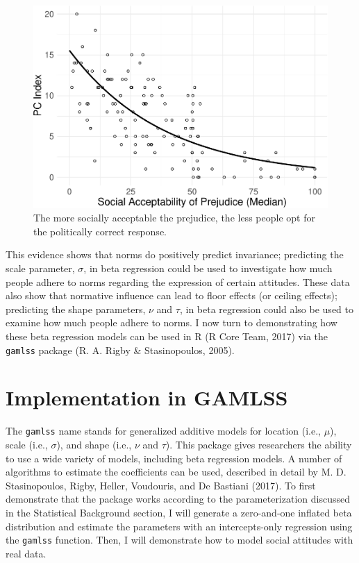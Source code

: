 \documentclass[english,man]{apa6}
\theoremstyle{definition}
\theoremstyle{definition}
\theoremstyle{remark}
\begin{document}
\begin{figure}
\centering
\includegraphics{beta_hurdle_files/figure-latex/unnamed-chunk-4-1.pdf}
\caption{\label{fig:unnamed-chunk-4}The more socially acceptable the
prejudice, the less people opt for the politically correct response.}
\end{figure}

This evidence shows that norms do positively predict invariance;
predicting the scale parameter, \(\sigma\), in beta regression could be
used to investigate how much people adhere to norms regarding the
expression of certain attitudes. These data also show that normative
influence can lead to floor effects (or ceiling effects); predicting the
shape parameters, \(\nu\) and \(\tau\), in beta regression could also be
used to examine how much people adhere to norms. I now turn to
demonstrating how these beta regression models can be used in R (R Core
Team, 2017) via the \texttt{gamlss} package (R. A. Rigby \&
Stasinopoulos, 2005).

\section{Implementation in GAMLSS}\label{implementation-in-gamlss}

The \texttt{gamlss} name stands for generalized additive models for
location (i.e., \(\mu\)), scale (i.e., \(\sigma\)), and shape (i.e.,
\(\nu\) and \(\tau\)). This package gives researchers the ability to use
a wide variety of models, including beta regression models. A number of
algorithms to estimate the coefficients can be used, described in detail
by M. D. Stasinopoulos, Rigby, Heller, Voudouris, and De Bastiani
(2017). To first demonstrate that the package works according to the
parameterization discussed in the Statistical Background section, I will
generate a zero-and-one inflated beta distribution and estimate the
parameters with an intercepts-only regression using the \texttt{gamlss}
function. Then, I will demonstrate how to model social attitudes with
real data.
\end{document}
